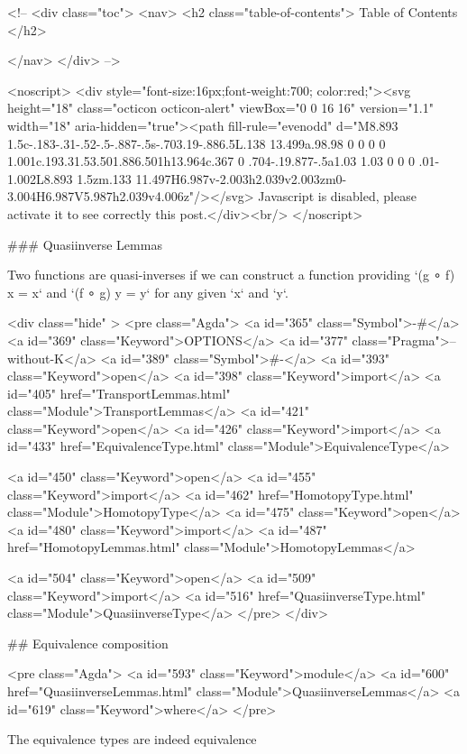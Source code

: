   <!-- 
  <div class="toc">
    <nav>
    <h2 class="table-of-contents"> Table of Contents </h2>
      

    </nav>
  </div>
   -->

  <noscript>
  <div style="font-size:16px;font-weight:700; color:red;"><svg height="18" class="octicon octicon-alert" viewBox="0 0 16 16" version="1.1" width="18" aria-hidden="true"><path fill-rule="evenodd" d="M8.893 1.5c-.183-.31-.52-.5-.887-.5s-.703.19-.886.5L.138 13.499a.98.98 0 0 0 0 1.001c.193.31.53.501.886.501h13.964c.367 0 .704-.19.877-.5a1.03 1.03 0 0 0 .01-1.002L8.893 1.5zm.133 11.497H6.987v-2.003h2.039v2.003zm0-3.004H6.987V5.987h2.039v4.006z"/></svg> Javascript is disabled, please activate it to see correctly this post.</div><br/>
  </noscript>

  ### Quasiinverse Lemmas

Two functions are quasi-inverses if we can construct a function providing
`(g ∘ f) x = x` and `(f ∘ g) y = y` for any given `x` and `y`.

<div class="hide" >
<pre class="Agda">
<a id="365" class="Symbol">{-#</a> <a id="369" class="Keyword">OPTIONS</a> <a id="377" class="Pragma">--without-K</a> <a id="389" class="Symbol">#-}</a>
<a id="393" class="Keyword">open</a> <a id="398" class="Keyword">import</a> <a id="405" href="TransportLemmas.html" class="Module">TransportLemmas</a>
<a id="421" class="Keyword">open</a> <a id="426" class="Keyword">import</a> <a id="433" href="EquivalenceType.html" class="Module">EquivalenceType</a>

<a id="450" class="Keyword">open</a> <a id="455" class="Keyword">import</a> <a id="462" href="HomotopyType.html" class="Module">HomotopyType</a>
<a id="475" class="Keyword">open</a> <a id="480" class="Keyword">import</a> <a id="487" href="HomotopyLemmas.html" class="Module">HomotopyLemmas</a>


<a id="504" class="Keyword">open</a> <a id="509" class="Keyword">import</a> <a id="516" href="QuasiinverseType.html" class="Module">QuasiinverseType</a>
</pre>
</div>

## Equivalence composition

<pre class="Agda">
<a id="593" class="Keyword">module</a> <a id="600" href="QuasiinverseLemmas.html" class="Module">QuasiinverseLemmas</a> <a id="619" class="Keyword">where</a>
</pre>

The equivalence types are indeed equivalence

